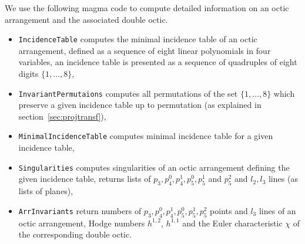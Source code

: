\documentclass[12pt]{amsart}
\theoremstyle{plain}
\theoremstyle{remark}
\theoremstyle{definition}
\numberwithin{table}{section}
\begin{document}
We use the following magma code to compute detailed information on an octic arrangement and the associated double octic.
\begin{itemize}\def\itemsep{2mm}\leftskip=-8mm\setlength{}
	\setlength  \itemindent{-5mm}
	\item[] \texttt{IncidenceTable} computes the minimal incidence table of an octic arrangement, defined as a sequence of eight linear polynomials in four variables, an incidence table is presented as a sequence of quadruples of eight digits $\{1,\dots,8\}$,
	\item[] \texttt{InvariantPermutaions} computes all permutations of the set $\{1,\dots,8\}$ which preserve a given incidence table up to permutation (as explained in section~\ref{sec:projtransf}),
	\item[] \texttt{MinimalIncidenceTable} computes minimal incidence table for a given incidence table,
	\item[] \texttt{Singularities} computes singularities of an octic arrangement defining the given incidence table, returns lists of $p_3, p_4^0, p_4^1, p_5^0, p_5^1$ and $p_5^2$ and  $l_2, l_3$ lines (as lists of planes),
	\item[] \texttt{ArrInvariants} return numbers of $p_3, p_4^0, p_4^1, p_5^0, p_5^1, p_5^2$ points and $l_{3}$ lines of an octic arrangement, Hodge numbers $h^{1,2}$, $h^{1,1}$ and the Euler characteristic $\chi$ of the corresponding double octic.
\end{itemize}




\end{document}

